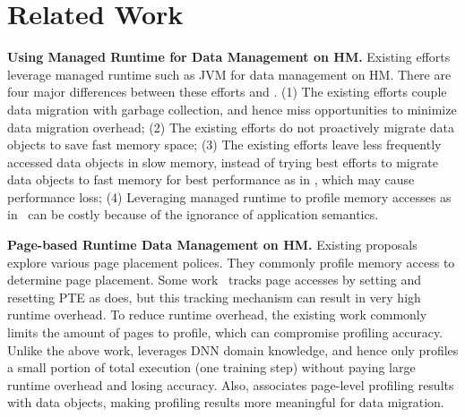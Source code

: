 \section{Related Work}


\textbf{Using Managed Runtime for Data Management on HM. }
Existing efforts~\cite{pldi19:panthera, pldi18:KG,ASPLOS18:Espresso,sigmetrics19:crystalgazer} leverage managed runtime such as JVM for data management on HM. There are four major differences between these efforts and \name. (1) The existing efforts couple data migration with garbage collection, and hence miss opportunities to minimize data migration overhead; (2) The existing efforts do not proactively migrate data objects to save fast memory space; (3) The existing efforts leave less frequently accessed data objects in slow memory, instead of trying best efforts to migrate data objects to fast memory for best performance as in \name, %
which may cause performance loss; (4) Leveraging managed runtime to profile memory accesses as in~\cite{pldi19:panthera, pldi18:KG} can be costly because of the ignorance of application semantics.


\textbf{Page-based Runtime Data Management on HM.}
Existing proposals~\cite{Thermostat:asplos17,RAMinate:socc16,heteros:isca17,unimem:sc17,sc18:wu,Yan:ASPLOS19} explore various page placement polices. They commonly profile memory access to determine page placement. Some work~\cite{Thermostat:asplos17,RAMinate:socc16,heteros:isca17} tracks page accesses by setting and resetting PTE as \name does, but this tracking mechanism can result in very high runtime overhead. To reduce runtime overhead, the existing work commonly limits the amount of pages to profile, which can compromise profiling accuracy. Unlike the above work, \name leverages DNN domain knowledge, and hence only profiles a small portion of total execution (one training step) without paying large runtime overhead and losing accuracy. Also, \name associates page-level profiling results with data objects, making profiling results more meaningful for data migration.

